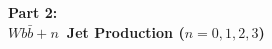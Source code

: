 \vspace*{60 mm}
\begin{center}
{\Huge{\textbf{Part 2:}}}\\
\vspace*{5 mm}
{\Huge{\textbf{\texorpdfstring{$Wb\bar{b}+n$}{Wbb+n}~Jet Production
(\texorpdfstring{$n=0,1,2,3$}{n=0,1,2,3})}}}
\end{center}
